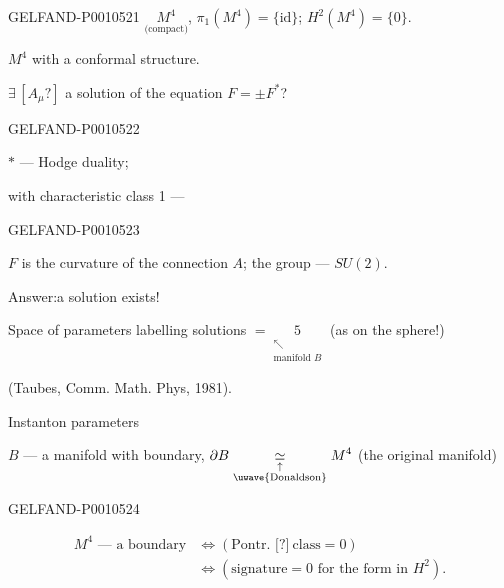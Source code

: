\begin{GelfandAdjacentEvidence}{GELFAND-P001052}{1}
\quad
$\underset{\text{(compact)}}{M^4}$,
$\pi_1(M^4)=\{\mathrm{id}\}$;
$H^2(M^4)=\{0\}$.

$M^4$ with a conformal structure.

$\exists\, [A_\mu?]$ a solution of the equation $F=\pm F^*$?
\end{GelfandAdjacentEvidence}
\begin{GelfandAdjacentEvidence}{GELFAND-P001052}{2}


$*$ — Hodge duality;

with characteristic class 1 — \uwave{[e.g.?]}
\end{GelfandAdjacentEvidence}
\begin{GelfandAdjacentEvidence}{GELFAND-P001052}{3}


$F$ is the curvature of the connection $A$; the group — $SU(2)$.

Answer:\quad a solution exists!

Space of parameters labelling solutions
$\displaystyle=\underset{\substack{\nwarrow\\\text{manifold }B}}{5}$
\qquad (as on the sphere!)

(Taubes, Comm. Math. Phys, 1981).

Instanton parameters

$B$ — a manifold with boundary,
$\displaystyle\partial B\underset{\substack{\uparrow\\\text{\uwave{Donaldson}}}}{\simeq}M^4$
\quad (the original manifold)
\end{GelfandAdjacentEvidence}
\begin{GelfandAdjacentEvidence}{GELFAND-P001052}{4}


\begin{align*}
M^4\text{ — a boundary}
&\Longleftrightarrow(\text{Pontr. }\text{[?]}\ \text{class}=0)\\
&\Longleftrightarrow(\text{signature}=0\text{ for the form in }H^2).
\end{align*}
\end{GelfandAdjacentEvidence}
